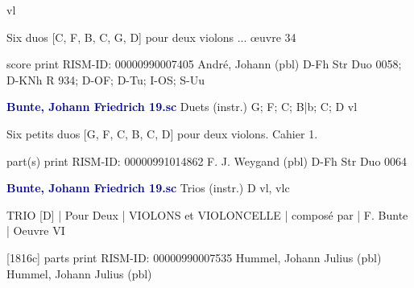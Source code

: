 \documentclass[twocolumn]{book}
\begin{document}
 vl
\newline \begin{itshape}Six duos [C, F, B, C, G, D] pour deux violons ... œuvre 34\end{itshape} 
\newline \textcolor{darkblue}{}  score  
\newline print
\newline RISM-ID: 00000990007405
\newline André, Johann  (pbl)
\newline D-Fh  Str Duo 0058; D-KNh  R 934; D-OF; D-Tu; I-OS; S-Uu
\newline \par \vspace{7pt} \textcolor{darkblue}{\textbf{Bunte, Johann Friedrich  19.sc}}
\newline Duets (instr.)  G; F; C; B|b; C; D  
 vl
\newline \begin{itshape}Six petits duos [G, F, C, B, C, D] pour deux violons. Cahier 1.\end{itshape} 
\newline \textcolor{darkblue}{}  part(s)  
\newline print
\newline RISM-ID: 00000991014862
\newline F. J. Weygand  (pbl)
\newline D-Fh  Str Duo 0064
\newline \par \vspace{7pt} \textcolor{darkblue}{\textbf{Bunte, Johann Friedrich  19.sc}}
\newline Trios (instr.)  D  
 vl, vlc
\newline \begin{itshape}TRIO [D] | Pour Deux | VIOLONS et VIOLONCELLE | composé par | F. Bunte | Oeuvre VI\end{itshape} 
\newline \textcolor{darkblue}{}  [1816c]  parts  
\newline print
\newline RISM-ID: 00000990007535
\newline Hummel, Johann Julius  (pbl)
\newline Hummel, Johann Julius  (pbl)
\end{document}
